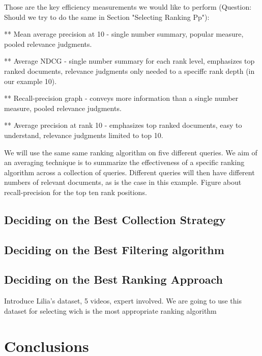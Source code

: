 \documentclass{llncs}
\begin{document}
Those are the key efficiency measurements we would like to perform (Question: Should we try to do the same in Section "Selecting Ranking Pp"):

** Mean average precision at 10  - single number summary, popular measure, pooled
relevance judgments.

** Average NDCG - single number summary for each rank level, emphasizes top ranked documents, relevance judgments only needed to a speciffc rank depth
(in our example 10).

** Recall-precision graph - conveys more information than a single number measure, pooled relevance judgments.

** Average precision at rank 10 - emphasizes top ranked documents, easy to understand, relevance judgments limited to top 10.

We will use the same same ranking algorithm on five different queries. We aim of an averaging technique is to summarize the effectiveness of a specific ranking algorithm across a collection of queries. Different queries will then have different numbers of relevant documents, as is the case in this example. Figure about recall-precision for the top ten rank positions.



\subsection{Deciding on the Best Collection Strategy}

\subsection{Deciding on the Best Filtering algorithm}


\subsection{Deciding on the Best Ranking Approach}
\label{sec:decidingRanking}
Introduce Lilia's dataset, 5 videos, expert involved. We are going to use this dataset for selecting wich is the most appropriate ranking algorithm





\section{Conclusions}
\label{sec:conclusions}
\end{document}
